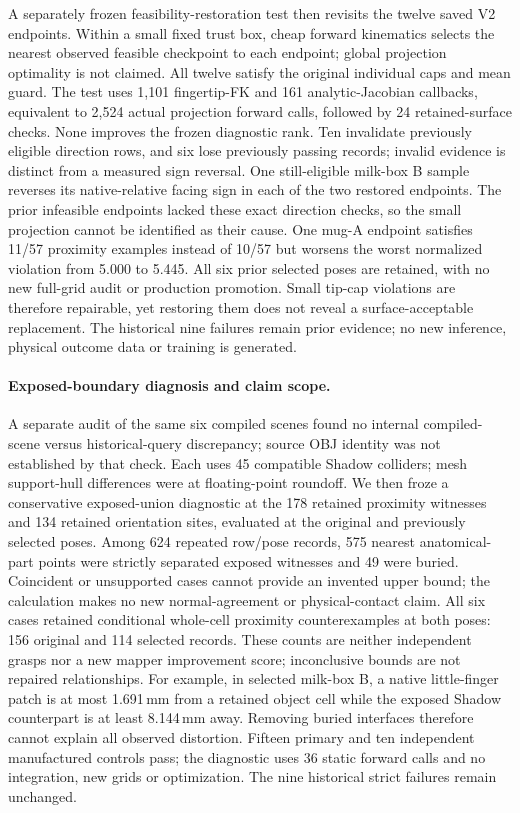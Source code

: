 \documentclass[10pt,letterpaper]{article}
\begin{document}
A separately frozen feasibility-restoration test then revisits the twelve saved
V2 endpoints. Within a small fixed trust box, cheap forward kinematics selects
the nearest observed feasible checkpoint to each endpoint; global projection
optimality is not claimed. All twelve satisfy the original individual caps
and mean guard. The test uses 1,101 fingertip-FK and 161 analytic-Jacobian
callbacks, equivalent to 2,524 actual projection forward calls, followed by
24 retained-surface checks. None improves the frozen diagnostic rank. Ten
invalidate previously eligible direction rows, and six lose previously
passing records; invalid evidence is distinct from a measured sign reversal.
One still-eligible milk-box B sample reverses its native-relative facing sign
in each of the two restored endpoints.
The prior infeasible endpoints lacked these exact direction checks, so the
small projection cannot be identified as their cause. One mug-A endpoint
satisfies 11/57 proximity examples instead of 10/57 but worsens the worst
normalized violation from 5.000 to 5.445. All six prior selected poses are
retained, with no new full-grid audit or production promotion. Small tip-cap
violations are therefore repairable, yet restoring them does not reveal a
surface-acceptable replacement. The historical nine failures remain prior
evidence; no new inference, physical outcome data or training is generated.
\paragraph{Exposed-boundary diagnosis and claim scope.}
A separate audit of the same six compiled scenes found no internal
compiled-scene versus historical-query discrepancy; source OBJ identity was
not established by that check. Each uses 45 compatible Shadow colliders;
mesh support-hull differences were at floating-point roundoff. We then froze a
conservative exposed-union diagnostic at the 178 retained proximity witnesses
and 134 retained orientation sites, evaluated at the original and previously
selected poses. Among 624 repeated row/pose records, 575 nearest anatomical-part
points were strictly separated exposed witnesses and 49 were buried. Coincident
or unsupported cases cannot provide an invented upper bound; the calculation
makes no new normal-agreement or physical-contact claim. All six cases retained
conditional whole-cell proximity counterexamples at both poses: 156 original
and 114 selected records. These counts are neither independent grasps nor a new
mapper improvement score; inconclusive bounds are not repaired relationships.
For example, in selected milk-box B, a native little-finger patch is at most
1.691\,mm from a retained object cell while the exposed Shadow counterpart is
at least 8.144\,mm away. Removing buried interfaces therefore cannot explain all
observed distortion. Fifteen primary and ten independent manufactured controls
pass; the diagnostic uses 36 static forward calls and no integration, new grids
or optimization. The nine historical strict failures remain unchanged.
\end{document}

